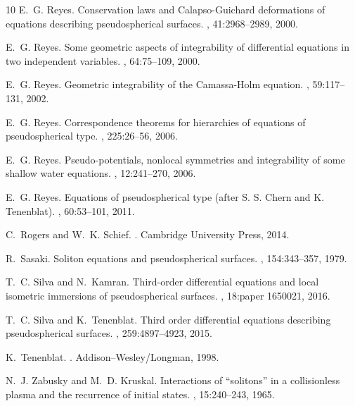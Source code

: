 \documentclass{cimart}
\begin{document}
{\begin{thebibliography}{10}
        E.~G. Reyes.
        \newblock Conservation laws and {C}alapso-{G}uichard deformations of equations
          describing pseudospherical surfaces.
        , 41:2968--2989, 2000.
        
        E.~G. Reyes.
        \newblock Some geometric aspects of integrability of differential equations in
          two independent variables.
        , 64:75--109, 2000.
        
        E.~G. Reyes.
        \newblock Geometric integrability of the {C}amassa-{H}olm equation.
        , 59:117--131, 2002.
        
        E.~G. Reyes.
        \newblock Correspondence theorems for hierarchies of equations of
          pseudospherical type.
        , 225:26--56, 2006.
        
        E.~G. Reyes.
        \newblock Pseudo-potentials, nonlocal symmetries and integrability of some
          shallow water equations.
        , 12:241--270, 2006.
        
        E.~G. Reyes.
        \newblock Equations of pseudospherical type (after {S}. {S}. {C}hern and {K}.
          {T}enenblat).
        , 60:53--101, 2011.
        
        C.~Rogers and W.~K. Schief.
        .
        \newblock Cambridge University Press, 2014.
        
        R.~Sasaki.
        \newblock Soliton equations and pseudospherical surfaces.
        , 154:343--357, 1979.
        
        T.~C. Silva and N.~Kamran.
        \newblock Third-order differential equations and local isometric immersions of
          pseudospherical surfaces.
        , 18:paper 1650021, 2016.
        
        T.~C. Silva and K.~Tenenblat.
        \newblock Third order differential equations describing pseudospherical
          surfaces.
        , 259:4897--4923, 2015.
        
        K.~Tenenblat.
        .
        \newblock Addison–Wesley/Longman, 1998.
        
        N.~J. Zabusky and M.~D. Kruskal.
        \newblock Interactions of ``solitons'' in a collisionless plasma and the
          recurrence of initial states.
        , 15:240--243, 1965.
    \end{thebibliography}
}
\end{document}
